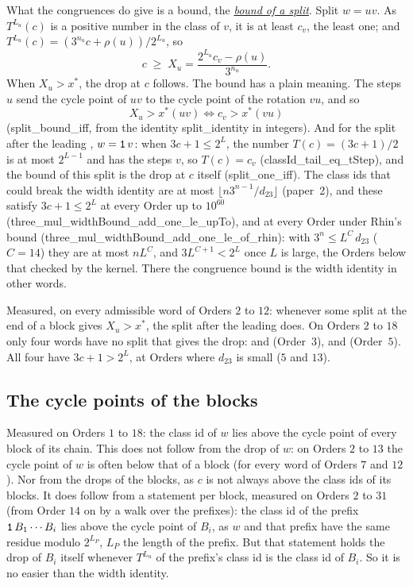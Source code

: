 \documentclass[10pt,a4paper,titlepage]{article}
\makeatletter
\newcommand{\termhere}[1]{\leavevmode
  \Hy@raisedlink{\hyper@anchorstart{term:#1}\hyper@anchorend}}
\newcommand{\keyterm}[2]{\hyperlink{box:#1}{\emph{#2}}}
\newcommand{\lean}[1]{\textsf{#1}}
\makeatother
\begin{document}
\termhere{splitbound}What the congruences do give is a bound, the \keyterm{splitbound}{bound of a split}. Split $w = uv$. As $T^{L_u}(c)$ is a positive
number in the class of $v$, it is at least $c_v$, the least one; and $T^{L_u}(c) =
(3^{n_u} c + \rho(u))/2^{L_u}$, so
\[
c \;\ge\; X_u = \frac{2^{L_u} c_v - \rho(u)}{3^{n_u}}.
\]
When $X_u > x^*$, the drop at $c$ follows. The bound has a plain meaning. The steps $u$
send the cycle point of $uv$ to the cycle point of the rotation $vu$, and so
\[
X_u > x^*(uv) \iff c_v > x^*(vu)
\]
(\lean{split\_bound\_iff}, from the identity \lean{split\_identity} in integers). And for
the split after the leading , $w = \text{\texttt{1}}\,v$: when $3c + 1 \le 2^L$, the number
$T(c) = (3c+1)/2$ is at most $2^{L-1}$ and has the steps $v$, so $T(c) = c_v$
(\lean{classId\_tail\_eq\_tStep}), and the bound of this split is the drop at $c$ itself
(\lean{split\_one\_iff}). The class ids that could break the width identity are at most
$\lfloor n 3^{n-1}/d_{23} \rfloor$ (paper~2), and these satisfy $3c + 1 \le 2^L$ at every
Order up to $10^{60}$ (\lean{three\_mul\_widthBound\_add\_one\_le\_upTo}), and at every Order under
Rhin's bound (\lean{three\_mul\_widthBound\_add\_one\_le\_of\_rhin}): with $3^n \le L^C\,d_{23}$ ($C = 14$) they
are at most $n L^C$, and $3 L^{C+1} < 2^L$ once $L$ is large, the Orders below that checked
by the kernel. There the congruence bound is the width identity in other words.

Measured, on every admissible word of Orders $2$ to $12$: whenever some split at the end of
a block gives $X_u > x^*$, the split after the leading  does. On Orders $2$ to $18$
only four words have no split that gives the drop:  and  (Order~$3$),
 and  (Order~$5$). All four have $3c + 1 > 2^L$, at Orders where
$d_{23}$ is small ($5$ and $13$).

\subsection*{The cycle points of the blocks}

Measured on Orders $1$ to $18$: the class id of $w$ lies above the cycle point of every
block of its chain. This does not follow from the drop of $w$: on Orders $2$ to $13$ the
cycle point of $w$ is often below that of a block (for every word of Orders $7$ and $12$).
Nor from the drops of the blocks, as $c$ is not always above the class ids of its blocks.
It does follow from a statement per block, measured on Orders $2$ to $31$ (from Order $14$
on by a walk over the prefixes): the class id of
the prefix $\text{\texttt{1}}\,B_1 \cdots B_i$ lies above the cycle point of $B_i$, as $w$ and that
prefix have the same residue modulo $2^{L_P}$, $L_P$ the length of the prefix. But that
statement holds the drop of $B_i$ itself whenever $T^{L_u}$ of the prefix's class id is
the class id of $B_i$. So it is no easier than the width identity.
\end{document}
